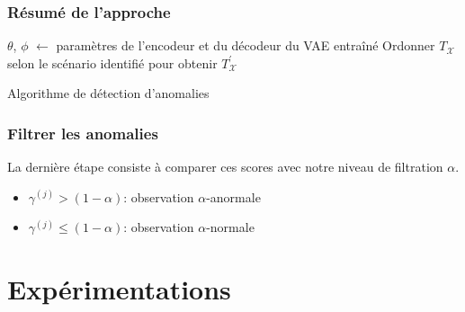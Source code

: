 \documentclass{beamer}
\begin{document}
	\begin{frame}
		\frametitle{Résumé de l'approche}
		\begin{center}
			\footnotesize
			\begin{algorithm}[H] \label{alg:metho}
				\SetAlgoLined
				$\theta$, $\phi$ $\leftarrow$ paramètres de l'encodeur et du  décodeur du VAE entraîné\;
				Ordonner $T_{\mathcal{X}}$ selon le scénario identifié pour obtenir $T^{'}_{\mathcal{X}}$ \;
				\caption{Algorithme de détection d'anomalies}
			\end{algorithm}
		\end{center}
		
	\end{frame}

	\begin{frame}
		\frametitle{Filtrer les anomalies}
		La dernière étape consiste à comparer ces scores avec notre niveau de filtration $\alpha$.
		\begin{itemize}
			\item $\gamma^{(j)} > (1 - \alpha)$: observation $\alpha$-anormale
			\item $\gamma^{(j)} \le (1 - \alpha)$: observation $\alpha$-normale
		\end{itemize}
		
	\end{frame}
	
	\section{Expérimentations}
	
\end{document}
